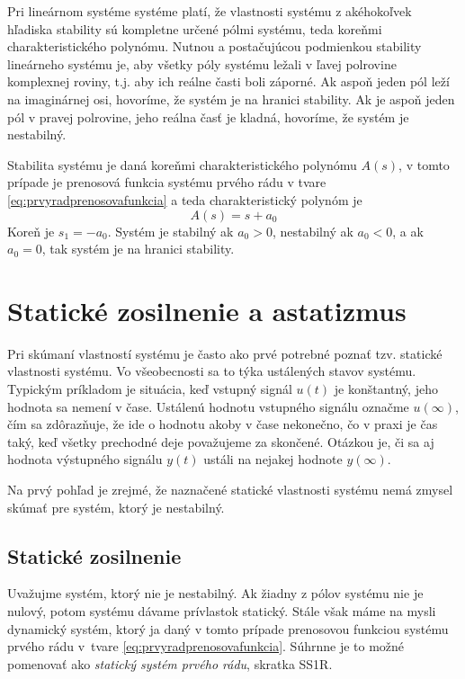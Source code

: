 \documentclass[a4paper, 10pt, ]{article}
\begin{document}
Pri lineárnom systéme systéme platí, že vlastnosti systému z akéhokoľvek hľadiska stability sú kompletne určené pólmi systému, teda koreňmi charakteristického polynómu. Nutnou a postačujúcou podmienkou stability lineárneho systému je, aby všetky póly systému ležali v ľavej polrovine komplexnej roviny, t.j. aby ich reálne časti boli záporné. Ak aspoň jeden pól leží na imaginárnej osi, hovoríme, že systém je na hranici stability. Ak je aspoň jeden pól v pravej polrovine, jeho reálna časť je kladná, hovoríme, že systém je nestabilný.

\bigskip

Stabilita systému je daná koreňmi charakteristického polynómu $A(s)$, v tomto prípade je prenosová funkcia systému prvého rádu v tvare \eqref{eq:prvyradprenosovafunkcia} a teda charakteristický polynóm je
\begin{equation}
    A(s) = s + a_0
\end{equation}
Koreň je $s_1 = -a_0$. Systém je stabilný ak $a_0 > 0$, nestabilný ak $a_0 < 0$, a ak $a_0 = 0$, tak systém je na hranici stability.




\section{Statické zosilnenie a astatizmus} 

Pri skúmaní vlastností systému je často ako prvé potrebné poznať tzv. statické vlastnosti systému. Vo všeobecnosti sa to týka ustálených stavov systému. Typickým príkladom je situácia, keď vstupný signál $u(t)$ je konštantný, jeho hodnota sa nemení v čase. Ustálenú hodnotu vstupného signálu označme $u(\infty)$, čím sa zdôrazňuje, že ide o hodnotu akoby v čase nekonečno, čo v praxi je čas taký, keď všetky prechodné deje považujeme za skončené. Otázkou je, či sa aj hodnota výstupného signálu $y(t)$ ustáli na nejakej hodnote $y(\infty)$. 

Na prvý pohľad je zrejmé, že naznačené statické vlastnosti systému nemá zmysel skúmať pre systém, ktorý je nestabilný.


\subsection{Statické zosilnenie}

Uvažujme systém, ktorý nie je nestabilný. Ak žiadny z pólov systému nie je nulový, potom systému dávame prívlastok statický. Stále však máme na mysli dynamický systém, ktorý ja daný v tomto prípade prenosovou funkciou systému prvého rádu v~tvare \eqref{eq:prvyradprenosovafunkcia}. Súhrnne je to možné pomenovať ako \emph{statický systém prvého rádu}, skratka SS1R.
\end{document}
